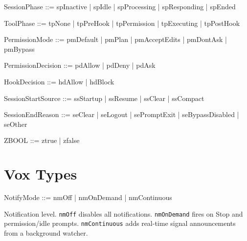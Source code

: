\documentclass[a4paper,10pt,fleqn]{article}
\begin{document}
\begin{zed}
\end{zed}

\begin{zed}
  SessionPhase ::= spInactive | spIdle | spProcessing | spResponding | spEnded
\end{zed}

\begin{zed}
  ToolPhase ::= tpNone | tpPreHook | tpPermission | tpExecuting | tpPostHook
\end{zed}

\begin{zed}
  PermissionMode ::= pmDefault | pmPlan | pmAcceptEdits | pmDontAsk | pmBypass
\end{zed}

\begin{zed}
  PermissionDecision ::= pdAllow | pdDeny | pdAsk
\end{zed}

\begin{zed}
  HookDecision ::= hdAllow | hdBlock
\end{zed}

\begin{zed}
  SessionStartSource ::= ssStartup | ssResume | ssClear | ssCompact
\end{zed}

\begin{zed}
  SessionEndReason ::= seClear | seLogout | sePromptExit | seBypassDisabled | seOther
\end{zed}

\begin{zed}
  ZBOOL ::= ztrue | zfalse
\end{zed}

\section{Vox Types}

\begin{zed}
  NotifyMode ::= nmOff | nmOnDemand | nmContinuous
\end{zed}

Notification level. \texttt{nmOff} disables all notifications.
\texttt{nmOnDemand} fires on Stop and permission/idle prompts.
\texttt{nmContinuous} adds real-time signal announcements from a
background watcher.
\end{document}
